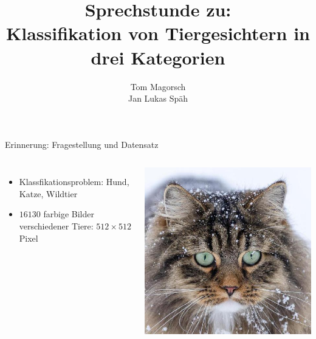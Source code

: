\documentclass[aspectratio=1610, 9pt]{beamer}
\title{Sprechstunde zu:\\Klassifikation von Tiergesichtern in drei Kategorien}
\author[T.~Magorsch,~J.~L.~Späh]{Tom Magorsch\\ Jan Lukas Späh}
\institute[ML-Seminar]{\\[0.3cm]TU Dortmund \\ \Large ML-Seminar}
\begin{document}
\maketitle


\begin{frame}{Erinnerung: Fragestellung und Datensatz}

  \begin{columns}
    \begin{itemize}
      \item Klassfikationsproblem: Hund, Katze, Wildtier\\
      \item $16130$ farbige Bilder verschiedener Tiere: $512\times 512$ Pixel
    \end{itemize}
    \includegraphics[scale=0.13]{images/cat.jpg}\\

\end{columns}
\end{frame}
\end{document}
